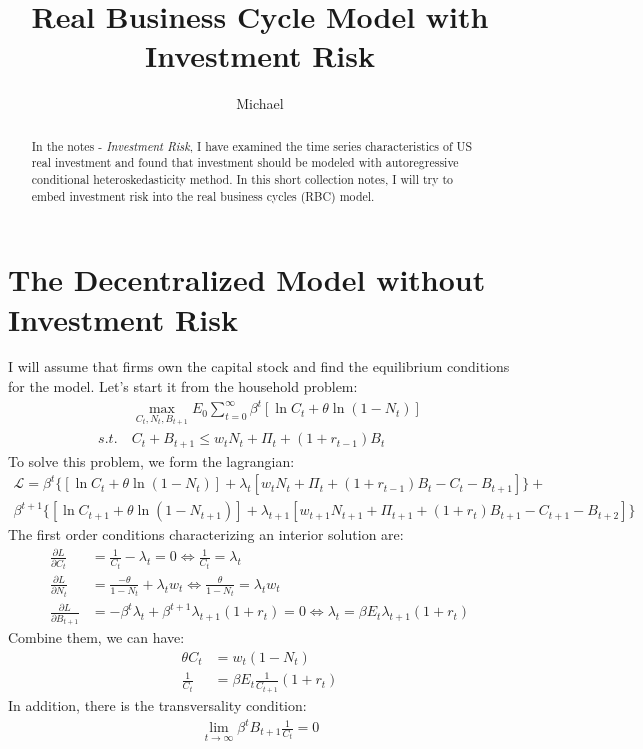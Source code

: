 \documentclass[12pt]{article}
\theoremstyle{definition}
\numberwithin{equation}{section}
\numberwithin{figure}{section}
\numberwithin{table}{section}
\begin{document}
\title{Real Business Cycle Model with Investment Risk}
\author{Michael}
\date{}
\maketitle

\begin{abstract}
  In the notes - \textit{Investment Risk}, I have examined the time series characteristics of US real investment and found that investment should be modeled with autoregressive conditional heteroskedasticity method. In this short collection notes, I will try to embed investment risk into the real business cycles (RBC) model.
\end{abstract}


\section{The Decentralized Model without Investment Risk}

I will assume that firms own the capital stock and find the equilibrium conditions for the model. Let's start it from the household problem:
\begin{align}
  & \max_{C_t, N_t, B_{t+1}} E_0 \sum_{t = 0}^\infty \beta^t [\ln C_t + \theta \ln(1- N_t)] \\
  s.t. \ & C_t + B_{t+1} \leq w_t N_t + \Pi_t + (1 + r_{t-1}) B_t
\end{align}
To solve this problem, we form the lagrangian:
\begin{gather*}
  \mathcal{L} = \beta^t \{ [\ln C_t + \theta \ln (1- N_t)] + \lambda_t [w_t N_t + \Pi_t + (1 +r_{t-1})B_t  - C_t - B_{t+1}]\} + \\
  \beta^{t+1}\{ [\ln C_{t+1} + \theta \ln (1- N_{t+1})] + \lambda_{t+1} [w_{t+1} N_{t+1} + \Pi_{t+1} + (1 +r_{t})B_{t+1}  - C_{t+1} - B_{t+2}]\}
\end{gather*}
The first order conditions characterizing an interior solution are:
\begin{align}
  \frac{\partial L}{\partial C_t} & = \frac{1}{C_t} - \lambda_t = 0 \Leftrightarrow \frac{1}{C_t} = \lambda_t  \\
  \frac{\partial L}{\partial N_t} & = \frac{-\theta}{1- N_t} + \lambda_t w_t \Leftrightarrow \frac{\theta}{1 - N_t} = \lambda_t w_t \\
  \frac{\partial L}{\partial B_{t+1}} & = - \beta^t \lambda_t + \beta^{t+1}\lambda_{t+1}(1+r_t) = 0 \Leftrightarrow \lambda_t = \beta E_t \lambda_{t+1}(1+r_t)
\end{align}
Combine them, we can have:
\begin{align}
  \theta C_t & = w_t ( 1- N_t ) \\
  \frac{1}{C_t} & = \beta E_t \frac{1}{C_{t+1}} (1 + r_t )
\end{align}
In addition, there is the transversality condition:
\begin{align}
  \lim_{t \to \infty} \beta^t B_{t+1}\frac{1}{C_t} = 0
\end{align}
\end{document}
